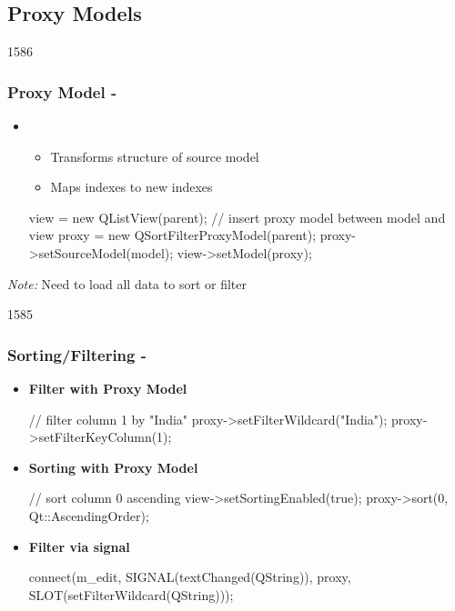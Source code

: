 %
%
%
%

\subsection{Proxy Models}
\begin{slide}[fragile]{1586}\frametitle{Proxy Model - }
  \begin{itemize}
  \item {}
    \begin{itemize}
    \item Transforms structure of source model
    \item Maps indexes to new indexes
    \end{itemize}
\begin{cpp}
view = new QListView(parent);
// insert proxy model between model and view
proxy = new QSortFilterProxyModel(parent);
proxy->setSourceModel(model);
view->setModel(proxy);
\end{cpp}
  \end{itemize}
\textit{Note:} Need to load all data to sort or filter
\end{slide}
\begin{slide}[fragile]{1585}\frametitle{Sorting/Filtering - }
  \begin{itemize}
  \item \textbf{Filter with Proxy Model}
\begin{cpp}
// filter column 1 by "India"
proxy->setFilterWildcard("India");
proxy->setFilterKeyColumn(1); 
\end{cpp}
\item \textbf{Sorting with Proxy Model}
\begin{cpp}
// sort column 0 ascending
view->setSortingEnabled(true);
proxy->sort(0, Qt::AscendingOrder);
\end{cpp}
  \end{itemize}
\medskip
\begin{itemize}
\item \textbf{Filter via  signal}
\begin{cpp}
connect(m_edit, SIGNAL(textChanged(QString)), 
    proxy, SLOT(setFilterWildcard(QString)));      
\end{cpp}
\end{itemize}
\end{slide}

